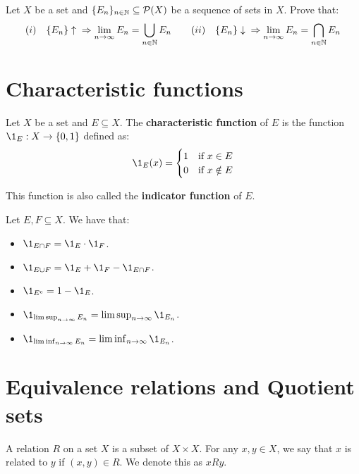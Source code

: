 \begin{fexercise}
    Let $X$ be a set and $\{E_n\}_{n \in \mathbb{N}} \subseteq \mathcal{P}(X)$ be a sequence of sets in $X$.
    Prove that:
    $$(i) \quad \{E_n\} \uparrow \;\; \Rightarrow \lim_{n \to \infty} E_n = \bigcup_{n \in \mathbb{N}} E_n \qquad (ii) \quad \{E_n\} \downarrow \;\; \Rightarrow \lim_{n \to \infty} E_n = \bigcap_{n \in \mathbb{N}} E_n$$
\end{fexercise}

\section{Characteristic functions}

\begin{fdefinition}
    Let $X$ be a set and $E \subseteq X$. The \textbf{characteristic function} of $E$ is
    the function $\1_E: X \to \{0, 1\}$ defined as:
    $$\1_E(x) = \begin{cases}
        1 & \text{if } x \in E \\
        0 & \text{if } x \notin E
    \end{cases}$$

    This function is also called the \textbf{indicator function} of $E$.
\end{fdefinition}

\begin{fnote}
    Let $E, F \subseteq X$. We have that:
    \begin{itemize}
        \item $\1_{E \cap F} = \1_E \cdot \1_F$.
        \item $\1_{E \cup F} = \1_E + \1_F - \1_{E \cap F}$.
        \item $\1_{E^c} = 1 - \1_E$.
        \item $\1_{\limsup_{n \to \infty} E_n} = \limsup_{n \to \infty} \1_{E_n}$.
        \item $\1_{\liminf_{n \to \infty} E_n} = \liminf_{n \to \infty} \1_{E_n}$.
    \end{itemize}
\end{fnote}

\section{Equivalence relations and Quotient sets}

\begin{fdefinition}
    A relation $R$ on a set $X$ is a subset of $X \times X$. For any $x, y \in X$,
    we say that $x$ is related to $y$ if $(x, y) \in R$. We denote this as $xRy$.
\end{fdefinition}

